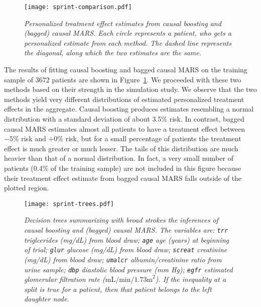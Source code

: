 \documentclass{article}
\begin{document}
\begin{figure}
\caption{\it Personalized treatment effect estimates from causal boosting and
  (bagged) causal MARS. Each circle represents a patient, who gets a
  personalized
  estimate from each method. The dashed line represents the diagonal, along
  which the two estimates are the same.}
\label{fig-sprint-comparison}
\centering
\texttt{[image: sprint-comparison.pdf]}
\end{figure}

The results of fitting causal boosting and bagged causal MARS on the training
sample
of 3672 patients are shown in Figure~\ref{fig-sprint-comparison}.
We proceeded with these two methods
based on their strength in the simulation study. We observe
that the two methods yield very different distributions of estimated
personalized treatment effects in the aggregate. Causal boosting produces
estimates resembling a normal distribution with a standard deviation of about
3.5\% risk. In contrast, bagged causal MARS estimates almost all patients to
have a
treatment effect between $-5\%$ risk and $+0\%$ risk, but for a small
percentage of patients the treatment effect is much greater or much lesser.
The tails of this distribution are much heavier than that of a normal
distribution. In fact, a very small number of patients (0.4\% of the training
sample) are not included in this figure because their treatment effect estimate
from bagged causal MARS falls outside of the plotted region.

\begin{figure}
\caption{\it Decision trees summarizing with broad strokes the inferences of
  causal boosting and (bagged) causal
  MARS. The variables are:
  {\tt trr} triglcerides (mg/dL) from blood draw;
  {\tt age} age (years) at beginning of trial;
  {\tt glur} glucose (mg/dL) from blood draw;
  {\tt screat} creatinine (mg/dL) from blood draw;
  {\tt umalcr} albumin/creatinine ratio from urine sample;
  {\tt dbp} diastolic blood pressure (mm Hg);
  {\tt egfr} estimated glomerular filtration rate ($\mbox{mL/min/1.73m}^2$).
  If the inequality at a split is
  true for a patient, then that patient belongs to the left daughter node.}
\label{fig-sprint-trees}
\centering
\texttt{[image: sprint-trees.pdf]}
\end{figure}
\end{document}
